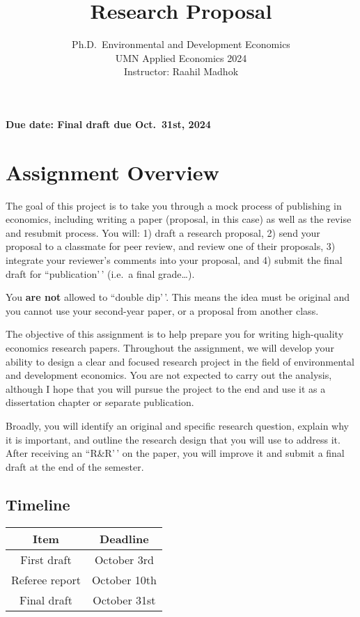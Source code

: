 \documentclass[
]{article}
\title{Research Proposal}
\subtitle{Ph.D.~Environmental and Development Economics\\
UMN Applied Economics 2024\\
Instructor: Raahil Madhok}
\author{}
\date{\vspace{-2.5em}}
\begin{document}
\maketitle

\textbf{Due date: Final draft due Oct.~31st, 2024}

\hypertarget{assignment-overview}{%
\section{Assignment Overview}\label{assignment-overview}}

The goal of this project is to take you through a mock process of publishing in economics, including writing a paper (proposal, in this case) as well as the revise and resubmit process. You will: 1) draft a research proposal, 2) send your proposal to a classmate for peer review, and review one of their proposals, 3) integrate your reviewer's comments into your proposal, and 4) submit the final draft for ``publication'\,' (i.e.~a final grade\ldots).

You \textbf{are not} allowed to ``double dip'\,'. This means the idea must be original and you cannot use your second-year paper, or a proposal from another class.

The objective of this assignment is to help prepare you for writing high-quality economics research papers. Throughout the assignment, we will develop your ability to design a clear and focused research project in the field of environmental and development economics. You are not expected to carry out the analysis, although I hope that you will pursue the project to the end and use it as a dissertation chapter or separate publication.

Broadly, you will identify an original and specific research question, explain why it is important, and outline the research design that you will use to address it. After receiving an ``R\&R'\,' on the paper, you will improve it and submit a final draft at the end of the semester.

\hypertarget{timeline}{%
\subsection{Timeline}\label{timeline}}

\begin{table}[ht]
\begin{tabular}{|c|c|}
\hline
\textbf{Item} & \textbf{Deadline} \\ \hline
First draft     & October 3rd     \\ \hline
Referee report    & October 10th     \\ \hline
Final draft    & October 31st     \\ \hline
\end{tabular}
\end{table}
\end{document}
